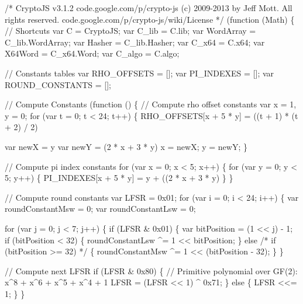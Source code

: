 \begin{DoxyCodeInclude}
\textcolor{comment}{/*}
\textcolor{comment}{CryptoJS v3.1.2}
\textcolor{comment}{code.google.com/p/crypto-js}
\textcolor{comment}{(c) 2009-2013 by Jeff Mott. All rights reserved.}
\textcolor{comment}{code.google.com/p/crypto-js/wiki/License}
\textcolor{comment}{*/}
(\textcolor{keyword}{function} (Math) \{
    \textcolor{comment}{// Shortcuts}
    var C = CryptoJS;
    var C\_lib = C.lib;
    var WordArray = C\_lib.WordArray;
    var Hasher = C\_lib.Hasher;
    var C\_x64 = C.x64;
    var X64Word = C\_x64.Word;
    var C\_algo = C.algo;

    \textcolor{comment}{// Constants tables}
    var RHO\_OFFSETS = [];
    var PI\_INDEXES  = [];
    var ROUND\_CONSTANTS = [];

    \textcolor{comment}{// Compute Constants}
    (\textcolor{keyword}{function} () \{
        \textcolor{comment}{// Compute rho offset constants}
        var x = 1, y = 0;
        \textcolor{keywordflow}{for} (var t = 0; t < 24; t++) \{
            RHO\_OFFSETS[x + 5 * y] = ((t + 1) * (t + 2) / 2) %

            var newX = y %
            var newY = (2 * x + 3 * y) %
            x = newX;
            y = newY;
        \}

        \textcolor{comment}{// Compute pi index constants}
        \textcolor{keywordflow}{for} (var x = 0; x < 5; x++) \{
            \textcolor{keywordflow}{for} (var y = 0; y < 5; y++) \{
                PI\_INDEXES[x + 5 * y] = y + ((2 * x + 3 * y) %
            \}
        \}

        \textcolor{comment}{// Compute round constants}
        var LFSR = 0x01;
        \textcolor{keywordflow}{for} (var i = 0; i < 24; i++) \{
            var roundConstantMsw = 0;
            var roundConstantLsw = 0;

            \textcolor{keywordflow}{for} (var j = 0; j < 7; j++) \{
                \textcolor{keywordflow}{if} (LFSR & 0x01) \{
                    var bitPosition = (1 << j) - 1;
                    \textcolor{keywordflow}{if} (bitPosition < 32) \{
                        roundConstantLsw ^= 1 << bitPosition;
                    \} \textcolor{keywordflow}{else} \textcolor{comment}{/* if (bitPosition >= 32) */} \{
                        roundConstantMsw ^= 1 << (bitPosition - 32);
                    \}
                \}

                \textcolor{comment}{// Compute next LFSR}
                \textcolor{keywordflow}{if} (LFSR & 0x80) \{
                    \textcolor{comment}{// Primitive polynomial over GF(2): x^8 + x^6 + x^5 + x^4 + 1}
                    LFSR = (LFSR << 1) ^ 0x71;
                \} \textcolor{keywordflow}{else} \{
                    LFSR <<= 1;
                \}
            \}


\end{DoxyCodeInclude}
